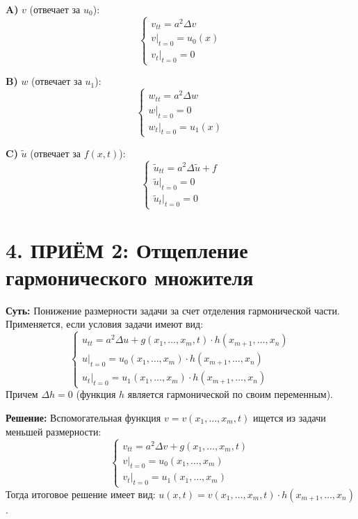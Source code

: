 \documentclass[a4paper,10pt]{article}
\begin{document}
\vspace{0.2cm}
\noindent
\begin{minipage}{0.32\textwidth}
\textbf{A)} $v$ (отвечает за $u_0$): 
\[ \begin{cases} v_{tt} = a^2\Delta v \\ v|_{t=0} = u_0(x) \\ v_t|_{t=0} = 0 \end{cases} \]
\end{minipage}
\hfill
\begin{minipage}{0.32\textwidth}
\textbf{B)} $w$ (отвечает за $u_1$): 
\[ \begin{cases} w_{tt} = a^2\Delta w \\ w|_{t=0} = 0 \\ w_t|_{t=0} = u_1(x) \end{cases} \]
\end{minipage}
\hfill
\begin{minipage}{0.32\textwidth}
\textbf{C)} $\tilde{u}$ (отвечает за $f(x,t)$): 
\[ \begin{cases} \tilde{u}_{tt} = a^2\Delta \tilde{u} + f \\ \tilde{u}|_{t=0} = 0 \\ \tilde{u}_t|_{t=0} = 0 \end{cases} \]
\end{minipage}

\section{4. ПРИЁМ 2: Отщепление гармонического множителя}
\textbf{Суть:} Понижение размерности задачи за счет отделения гармонической части. Применяется, если условия задачи имеют вид: 
\[
\begin{cases} 
u_{tt} = a^2 \Delta u + g(x_1, \dots, x_m, t) \cdot h(x_{m+1}, \dots, x_n) \\ 
u|_{t=0} = u_0(x_1, \dots, x_m) \cdot h(x_{m+1}, \dots, x_n) \\ 
u_t|_{t=0} = u_1(x_1, \dots, x_m) \cdot h(x_{m+1}, \dots, x_n) 
\end{cases}
\]
Причем $\Delta h = 0$ (функция $h$ является гармонической по своим переменным).

\noindent\textbf{Решение:} Вспомогательная функция $v = v(x_1, \dots, x_m, t)$ ищется из задачи меньшей размерности: 
\[
\begin{cases} 
v_{tt} = a^2 \Delta v + g(x_1, \dots, x_m, t) \\ 
v|_{t=0} = u_0(x_1, \dots, x_m) \\ 
v_t|_{t=0} = u_1(x_1, \dots, x_m) 
\end{cases}
\]
Тогда итоговое решение имеет вид: $u(x, t) = v(x_1, \dots, x_m, t) \cdot h(x_{m+1}, \dots, x_n)$.
\end{document}
